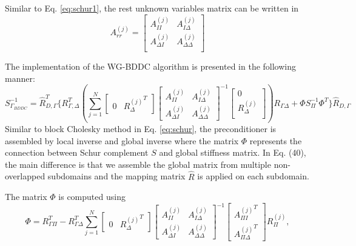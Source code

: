 Similar to Eq. \eqref{eq:schur1}, the rest unknown variables matrix can be written in
\begin{equation}
A_{rr}^{(j)} = \begin{bmatrix}
A_{II}^{(j)} & A_{I \Delta}^{(j)} \\
A_{\Delta I}^{(j)} & A_{\Delta \Delta}^{(j)}\\
\end{bmatrix}
\end{equation}

The implementation of the WG-BDDC algorithm is presented in the following manner:
\begin{equation} \label{eq:bddc}
S_{\Gamma_{BDDC}}^{-1}=\hat{R}_{D,\Gamma}^{T} \{ R_{\Gamma, \Delta}^{T} (\sum_{j = 1}^{N}\begin{bmatrix}
0 & {R_{\Delta}^{(j)}}^{T}
\end{bmatrix} \begin{bmatrix}
A_{II}^{(j)} & A_{I \Delta}^{(j)} \\
A_{\Delta I}^{(j)} & A_{\Delta \Delta}^{(j)}
\end{bmatrix}^{-1} \begin{bmatrix}
0 \\ R_{\Delta}^{(j)}\\
\end{bmatrix} )  R_{\Gamma \Delta} + \Phi S_{\Pi}^{-1} \Phi^{T}\} \hat{R}_{D, \Gamma}
\end{equation}
Similar to block Cholesky method in Eq. \eqref{eq:schur}, the preconditioner is assembled by local inverse and global inverse where the matrix $ \Phi $ represents the connection between Schur complement $ S $ and global stiffness matrix. In Eq. (40), the main difference is that we assemble the global matrix from multiple non-overlapped subdomains and the mapping matrix $ \hat{R} $ is applied on each subdomain.

The matrix $ \Phi $ is computed using
\begin{equation} \label{eq:bddc1}
\Phi = R_{\Gamma\Pi}^{T} - R_{\Gamma \Delta}^{T} \sum_{j = 1}^{N} \begin{bmatrix}
0 & {R_{\Delta}^{(j)}}^{T} 
\end{bmatrix} \begin{bmatrix}
A_{II}^{(j)} & A_{I \Delta}^{(j)} \\
A_{\Delta I}^{(j)} & A_{\Delta \Delta}^{(j)}
\end{bmatrix}^{-1} \begin{bmatrix}
{A_{\Pi I}^{(j)}}^{T} \\ {A_{\Pi \Delta}^{(j)}}^{T} 
\end{bmatrix} R_{\Pi}^{(j)} ,
\end{equation}


